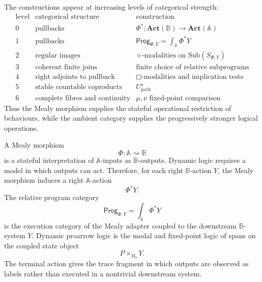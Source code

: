 \begin{remark}
\label{rem:relative-hierarchy-of-structure}
The constructions appear at increasing levels of categorical strength:
\[
\begin{array}{c|c|c}
\text{level} & \text{categorical structure} & \text{construction} \\
\hline
0 & \text{pullbacks} &
\Phi^\ast:\mathbf{Act}(\mathbb B)\to\mathbf{Act}(\mathbb A) \\
1 & \text{pullbacks} &
\mathsf{Prog}_{\Phi,Y}=\int_{\mathbb A}\Phi^\ast Y \\
2 & \text{regular images} &
\diamond\text{-modalities on }\mathrm{Sub}(S_{\Phi,Y}) \\
3 & \text{coherent finite joins} &
\text{finite choice of relative subprograms} \\
4 & \text{right adjoints to pullback} &
\Box\text{-modalities and implication tests} \\
5 & \text{stable countable coproducts} &
U^\star_{\mathrm{path}} \\
6 & \text{complete fibres and continuity} &
\mu,\nu\text{ fixed-point comparison}
\end{array}
\]
Thus the Mealy morphism supplies the stateful operational restriction of
behaviours, while the ambient category supplies the progressively stronger
logical operations.
\end{remark}

\begin{remark}
\label{rem:relative-final-summary}
A Mealy morphism
\[
\Phi:\mathbb A\rightsquigarrow\mathbb B
\]
is a stateful interpretation of \(\mathbb A\)-inputs as \(\mathbb B\)-outputs.
Dynamic logic requires a model in which outputs can act. Therefore, for each
right \(\mathbb B\)-action \(Y\), the Mealy morphism induces a right
\(\mathbb A\)-action
\[
\Phi^\ast Y.
\]
The relative program category
\[
\mathsf{Prog}_{\Phi,Y}
=
\int_{\mathbb A}\Phi^\ast Y
\]
is the execution category of the Mealy adapter coupled to the downstream
\(\mathbb B\)-system \(Y\). Dynamic proarrow logic is the modal and fixed-point
logic of spans on the coupled state object
\[
P\times_{B_0}Y.
\]
The terminal action gives the trace fragment in which outputs are observed as
labels rather than executed in a nontrivial downstream system.
\end{remark}